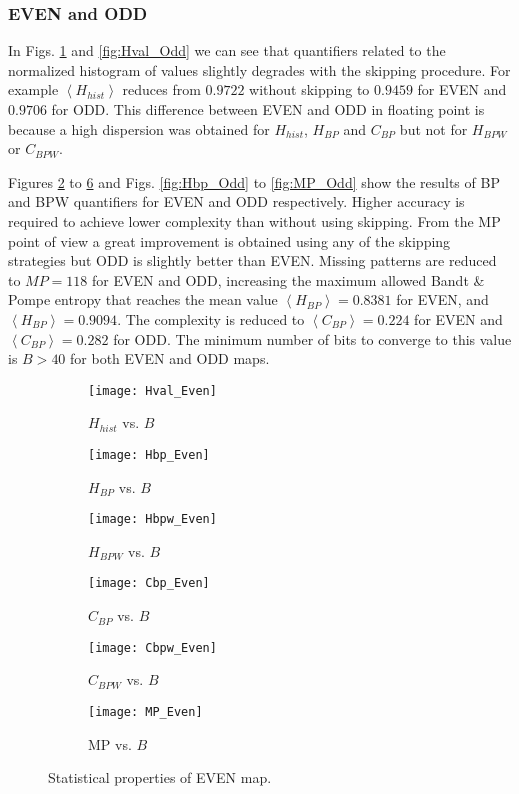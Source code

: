 \subsubsection{EVEN and ODD} \label{sssec:skipp}

In Figs. \ref{fig:Hval_Even} and \ref{fig:Hval_Odd} we can see that quantifiers related to the normalized histogram of values slightly degrades with the skipping procedure.
For example $\left\langle H_{hist}\right\rangle $ reduces from $0.9722$ without skipping to $0.9459$ for EVEN and $0.9706$ for ODD. 
This difference between EVEN and ODD in floating point is because a high dispersion was obtained for $H_{hist}$, $H_{BP}$ and $C_{BP}$ but not for $H_{BPW}$ or $C_{BPW}$.

Figures \ref{fig:Hbp_Even} to \ref{fig:MP_Even} and Figs. \ref{fig:Hbp_Odd} to \ref{fig:MP_Odd} show the results of BP and BPW quantifiers for EVEN and ODD respectively.
Higher accuracy is required to achieve lower complexity than without using skipping.
From the MP point of view a great improvement is obtained using any of the skipping strategies but ODD is slightly better than EVEN.
Missing patterns are reduced to $MP = 118$ for EVEN and ODD, increasing the maximum allowed Bandt \& Pompe entropy that reaches the mean value $\left\langle H_{BP}\right\rangle  = 0.8381$ for EVEN, and $\left\langle H_{BP}\right\rangle  = 0.9094$.
The complexity is reduced to $\left\langle C_{BP}\right\rangle = 0.224$ for EVEN and $\left\langle C_{BP}\right\rangle = 0.282$ for ODD.
The minimum number of bits to converge to this value is $B>40$ for both EVEN and ODD maps.

\begin{figure}[htpb]
	\centering
	\begin{subfigure}[b]{0.49\textwidth}
		\texttt{[image: Hval\_Even]}
		\caption{$H_{hist}$ vs. $B$}
		\label{fig:Hval_Even}
	\end{subfigure}
	\begin{subfigure}[b]{0.49\textwidth}
		\texttt{[image: Hbp\_Even]}
		\caption{$H_{BP}$ vs. $B$}
		\label{fig:Hbp_Even}
	\end{subfigure}
	\begin{subfigure}[b]{0.49\textwidth}
		\texttt{[image: Hbpw\_Even]}
		\caption{$H_{BPW}$ vs. $B$}
		\label{fig:Hbpw_Even}
	\end{subfigure}
	\begin{subfigure}[b]{0.49\textwidth}
		\texttt{[image: Cbp\_Even]}
		\caption{$C_{BP}$ vs. $B$}
		\label{fig:Cbp_Even}
	\end{subfigure}
	\begin{subfigure}[b]{0.49\textwidth}
		\texttt{[image: Cbpw\_Even]}
		\caption{$C_{BPW}$ vs. $B$}
		\label{fig:Cbpw_Even}
	\end{subfigure}
	\begin{subfigure}[b]{0.49\textwidth}
		\texttt{[image: MP\_Even]}
		\caption{MP vs. $B$}
		\label{fig:MP_Even}
	\end{subfigure}
	\caption{Statistical properties of EVEN map.}
	\label{fig:EVEN_QuantiB}
\end{figure}

